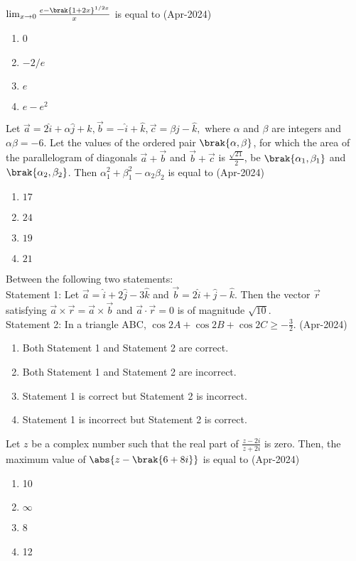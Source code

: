 \item $\lim_{x \to 0} \frac{e-\brak{1+2x}^{1/2x}}{x}$ is equal to \hfill(Apr-2024)
\begin{enumerate}
    \item 0
    \item $-2/e$
    \item $e$
    \item $e-e^2$
\end{enumerate}
\item Let $\vec{a} = 2\hat{i} + \alpha\hat{j} + \hat{k}, \vec{b} = -\hat{i} + \hat{k}, \vec{c}=\beta\hat{j}-\hat{k},$ where $\alpha$ and $\beta$ are integers and $\alpha\beta=-6$. Let the values of the ordered pair $\brak{\alpha,\beta}$, for which the area of the parallelogram of diagonals $\vec{a}+\vec{b}$ and $\vec{b}+\vec{c}$ is $\frac{\sqrt{21}}{2}$, be $\brak{\alpha_1,\beta_1}$ and $\brak{\alpha_2,\beta_2}$. Then $\alpha_1^2+\beta_1^2-\alpha_2\beta_2$ is equal to \hfill(Apr-2024)
\begin{enumerate}
    \item $17$
    \item $24$
    \item $19$
    \item $21$
\end{enumerate}
\item Between the following two statements:\\
Statement 1: Let $\vec{a}=\hat{i}+2\hat{j}-3\hat{k}$ and $\vec{b}=2\hat{i}+\hat{j}-\hat{k}$. Then the vector $\vec{r}$ satisfying $\vec{a}\times\vec{r}=\vec{a}\times\vec{b}$ and $\vec{a}\cdot\vec{r}=0$ is of magnitude $\sqrt{10}$.\\
Statement 2: In a triangle ABC, $\cos{2A}+\cos{2B}+\cos{2C}\geq -\frac{3}{2}.$ \hfill(Apr-2024)
\begin{enumerate}
    \item Both Statement 1 and Statement 2 are correct.
    \item Both Statement 1 and Statement 2 are incorrect.
    \item Statement 1 is correct but Statement 2 is incorrect.
    \item Statement 1 is incorrect but Statement 2 is correct.
\end{enumerate}
\item Let $z$ be a complex number such that the real part of $\frac{z-2i}{z+2i}$ is zero. Then, the maximum value of $\abs{z-\brak{6+8i}}$ is equal to \hfill(Apr-2024)
\begin{enumerate}
    \item 10
    \item $\infty$
    \item 8
    \item 12
\end{enumerate}

